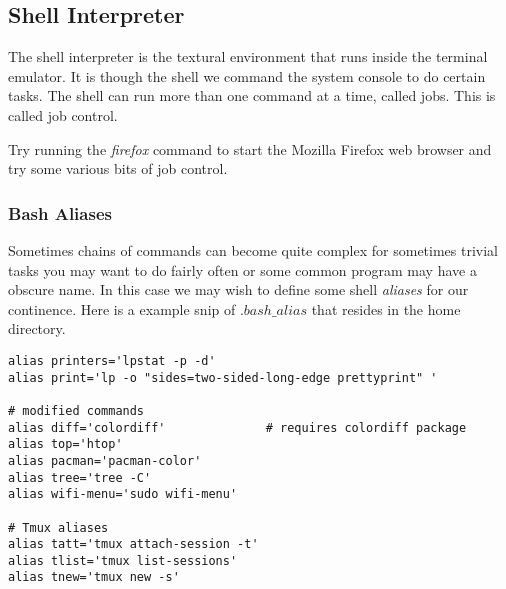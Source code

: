 
\subsection{Shell Interpreter} %
\label{sec:shell}

The shell interpreter is the textural environment that
runs inside the terminal emulator. It is though the shell
we command the system console to do certain tasks. The
shell can run more than one command at a time, called jobs.
This is called job control.

\begin{prob}
	Try running the \emph{firefox} command to start the
	Mozilla Firefox web browser and try some various bits
	of job control.
\end{prob}

\subsubsection{Bash Aliases}

Sometimes chains of commands can become quite complex for sometimes
trivial tasks you may want to do fairly often or some common program
may have a obscure name. In this case we may wish to define some
shell \emph{aliases} for our continence. Here is a example snip
of $.bash\_alias$ that resides in the home directory.

\begin{lstlisting}
alias printers='lpstat -p -d'
alias print='lp -o "sides=two-sided-long-edge prettyprint" '

# modified commands
alias diff='colordiff'              # requires colordiff package
alias top='htop'
alias pacman='pacman-color'
alias tree='tree -C'
alias wifi-menu='sudo wifi-menu'

# Tmux aliases
alias tatt='tmux attach-session -t'
alias tlist='tmux list-sessions'
alias tnew='tmux new -s'
\end{lstlisting}
